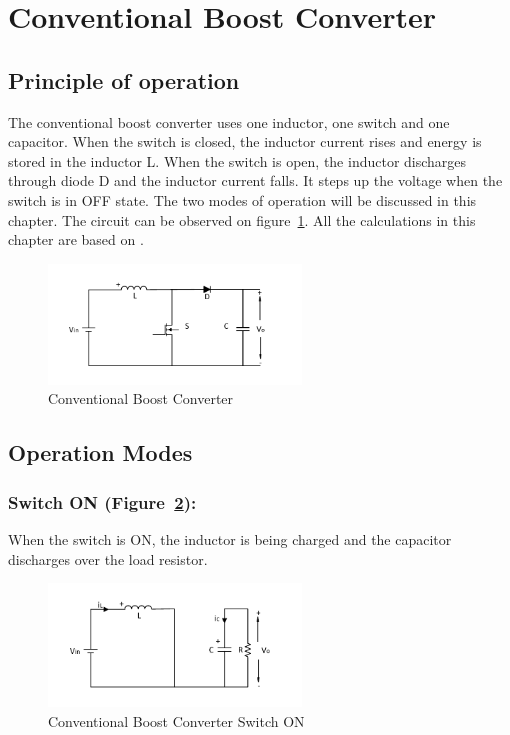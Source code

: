 \section{Conventional Boost Converter}\label{ch:CBC}
\subsection{Principle of operation}\label{sec:CBC_POC}

The conventional boost converter uses one inductor,
one switch and one capacitor. When the switch is closed, the inductor current rises and energy is stored in the inductor L. When the switch is open, the inductor discharges through diode D and the inductor current falls. It steps up the voltage when
the switch is in OFF state. The two modes of operation will be discussed in this chapter. The circuit can be observed on figure~\ref{fig:CBC}. All the calculations in this chapter are based on \cite{Hart2010}.

\begin{figure}[H]
   \centering
   \includegraphics[width=0.6\textwidth]{figures/aConventionalBoost/ConventionalBoostConverter.pdf}
    \caption{Conventional Boost Converter}
	\label{fig:CBC}
\end{figure}

\subsection{Operation Modes}\label{sec:CBC_OP}

\subsubsection{Switch ON (Figure~\ref{fig:CBC_ON}):}

When the switch is ON,
the inductor is being charged and the capacitor discharges over the load resistor.

\begin{figure}[H]
   \centering
   \includegraphics[width=0.6\textwidth]{figures/aConventionalBoost/ConventionalBoostConverterON.pdf}
    \caption{Conventional Boost Converter Switch ON}
	\label{fig:CBC_ON}
\end{figure}

